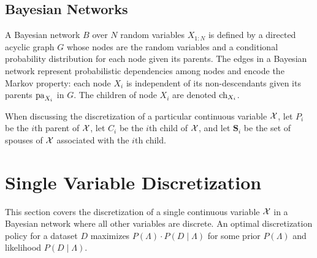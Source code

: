 \subsection{Bayesian Networks}

A Bayesian network $B$ over $N$ random variables $X_{1:N}$ is defined by a directed acyclic graph $G$ whose nodes are the random variables and a conditional probability distribution for each node given its parents.
The edges in a Bayesian network represent probabilistic dependencies among nodes and encode the Markov property: each node $X_i$ is independent of its non-descendants given its parents $\operatorname{pa}_{X_i}$ in $G$.
The children of node $X_i$ are denoted $\operatorname{ch}_{X_i}$.

When discussing the discretization of a particular continuous variable $\mathcal{X}$, let $P_i$ be the $i$th parent of $\mathcal{X}$, let $C_i$ be the $i$th child of $\mathcal{X}$, and let $\bm{S}_i$ be the set of spouses of $\mathcal{X}$ associated with the $i$th child.


\section{Single Variable Discretization}
\label{sec:single_var}

This section covers the discretization of a single continuous variable $\mathcal{X}$ in a Bayesian network where all other variables are discrete.
An optimal discretization policy for a dataset $D$ maximizes $P(\Lambda)\cdot P(D\mid \Lambda)$ for some prior $P(\Lambda)$ and likelihood $P(D\mid \Lambda)$.



